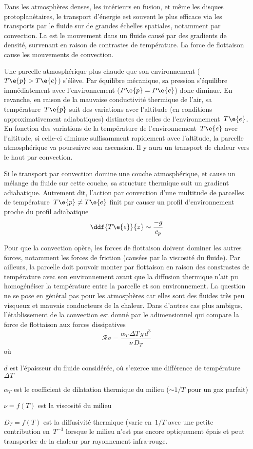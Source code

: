 
\sk
Dans les atmosphères denses, les intérieurs en fusion, et même les disques protoplanétaires, le transport d'énergie est souvent le plus efficace via les transports par le fluide sur de grandes échelles spatiales, notamment par convection. La  est le mouvement dans un fluide causé par des gradients de densité, survenant en raison de contrastes de température. La force de flottaison cause les mouvements de convection.

\sk
Une parcelle atmosphérique plus chaude que son environnement ($T\e{p}>T\e{e}$) s'élève. Par équilibre mécanique, sa pression s'équilibre immédiatement avec l'environnement ($P\e{p}=P\e{e}$) donc diminue. En revanche, en raison de la mauvaise conductivité thermique de l'air, sa température~$T\e{p}$ suit des variations avec l'altitude (en conditions approximativement adiabatiques) distinctes de celles de l'environnement~$T\e{e}$. En fonction des variations de la température de l'environnement~$T\e{e}$ avec l'altitude, si celle-ci diminue suffisamment rapidement avec l'altitude, la parcelle atmosphérique va poursuivre son ascension. Il y aura un transport de chaleur vers le haut par convection.

\sk
Si le transport par convection domine une couche atmosphérique, et cause un mélange du fluide sur cette couche, sa structure thermique suit un gradient adiabatique. Autrement dit, l'action par convection d'une multitude de parcelles de température~$T\e{p} \neq T\e{e}$ finit par causer un profil d'environnement proche du profil adiabatique 
\[ \ddf{T\e{e}}{z} \sim \frac{-g}{c_p} \]

\sk
Pour que la convection opère, les forces de flottaison doivent dominer les autres forces, notamment les forces de friction (causées par la viscosité du fluide). Par ailleurs, la parcelle doit pouvoir monter par flottaison en raison des constrastes de température avec son environnement avant que la diffusion thermique n'ait pu homogénéiser la température entre la parcelle et son environnement. La question ne se pose en général pas pour les atmosphères car elles sont des fluides très peu visqueux et mauvais conducteurs de la chaleur. Dans d'autres cas plus ambigus, l'établissement de la convection est donné par le  adimensionnel qui compare la force de flottaison aux forces dissipatives
\[ \mathcal{R}a = \frac{\alpha_T \, \Delta T \, g \, d^3}{\nu \, D_{T}} \]
\noindent où
\begin{citemize}
\item $d$ est l'épaisseur du fluide considérée, où s'exerce une différence de température~$\Delta T$
\item $\alpha_T$ est le coefficient de dilatation thermique du milieu ($\sim 1/T$ pour un gaz parfait)
\item $\nu = f(T)$ est la viscosité du milieu
\item $D_T = f(T)$ est la diffusivité thermique (varie en~$1/T$ avec une petite contribution en~$T^{-3}$ lorsque le milieu n'est pas encore optiquement épais et peut transporter de la chaleur par rayonnement infra-rouge.
\end{citemize}

